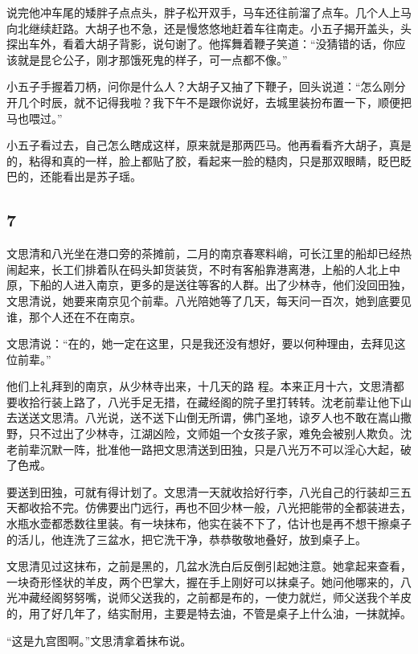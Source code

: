 说完他冲车尾的矮胖子点点头，胖子松开双手，马车还往前溜了点车。几个人上马向北继续赶路。大胡子也不急，还是慢悠悠地赶着车往南走。小五子揭开盖头，头探出车外，看着大胡子背影，说句谢了。他挥舞着鞭子笑道：“没猜错的话，你应该就是昆仑公子，刚才那饿死鬼的样子，可一点都不像。”

小五子手握着刀柄，问你是什么人？大胡子又抽了下鞭子，回头说道：“怎么刚分开几个时辰，就不记得我啦？我下午不是跟你说好，去城里装扮布置一下，顺便把马也喂过。”

小五子看过去，自己怎么瞎成这样，原来就是那两匹马。他再看看齐大胡子，真是的，粘得和真的一样，脸上都贴了胶，看起来一脸的糙肉，只是那双眼睛，眨巴眨巴的，还能看出是苏子瑶。
\newline

{\centering\subsection{7}}

文思清和八光坐在港口旁的茶摊前，二月的南京春寒料峭，可长江里的船却已经热闹起来，长工们排着队在码头卸货装货，不时有客船靠港离港，上船的人北上中原，下船的人进入南京，更多的是送往等客的人群。出了少林寺，他们没回田独，文思清说，她要来南京见个前辈。八光陪她等了几天，每天问一百次，她到底要见谁，那个人还在不在南京。

文思清说：“在的，她一定在这里，只是我还没有想好，要以何种理由，去拜见这位前辈。”

他们上礼拜到的南京，从少林寺出来，十几天的路
程。本来正月十六，文思清都要收拾行装上路了，八光手足无措，在藏经阁的院子里打转转。沈老前辈让他下山去送送文思清。八光说，送不送下山倒无所谓，佛门圣地，谅歹人也不敢在嵩山撒野，只不过出了少林寺，江湖凶险，文师姐一个女孩子家，难免会被别人欺负。沈老前辈沉默一阵，批准他一路把文思清送到田独，只是八光万不可以淫心大起，破了色戒。

要送到田独，可就有得计划了。文思清一天就收拾好行李，八光自己的行装却三五天都收拾不完。仿佛要出门远行，再也不回少林一般，八光把能带的全都装进去，水瓶水壶都悉数往里装。有一块抹布，他实在装不下了，估计也是再不想干擦桌子的活儿，他连洗了三盆水，把它洗干净，恭恭敬敬地叠好，放到桌子上。

文思清见过这抹布，之前是黑的，几盆水洗白后反倒引起她注意。她拿起来查看，一块奇形怪状的羊皮，两个巴掌大，握在手上刚好可以抹桌子。她问他哪来的，八光冲藏经阁努努嘴，说师父送我的，之前都是布的，一使力就烂，师父送我个羊皮的，用了好几年了，结实耐用，主要是特去油，不管是桌子上什么油，一抹就掉。

“这是九宫图啊。”文思清拿着抹布说。

